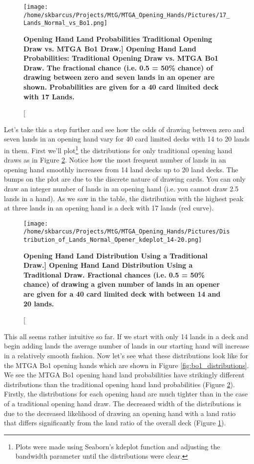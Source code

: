 \documentclass[oneside]{book}   %
\begin{document}
 	\begin{figure}[!ht]
	\centering
	\centerline{\texttt{[image: /home/skbarcus/Projects/MtG/MTGA\_Opening\_Hands/Pictures/17\_Lands\_Normal\_vs\_Bo1.png]}}
	\caption[\bf{Opening Hand Land Probabilities Traditional Opening Draw vs. MTGA Bo1 Draw.}]{
	{\bf{Opening Hand Land Probabilities: Traditional Opening Draw vs. MTGA Bo1 Draw.}} The fractional chance (i.e. 0.5 = 50\% chance) of drawing between zero and seven lands in an opener are shown. Probabilities are given for a 40 card limited deck with 17 Lands.}
	\label{fig:traditional_vs_bo1_17}
	\end{figure}	
	
Let's take this a step further and see how the odds of drawing between zero and seven lands in an opening hand vary for 40 card limited decks with 14 to 20 lands in them. First we'll plot\footnote{Plots were made using Seaborn's kdeplot function and adjusting the bandwidth parameter until the distributions were clear.} the distributions for only traditional opening hand draws as in Figure \ref{fig:traditional_distributions}. Notice how the most frequent number of lands in an opening hand smoothly increases from 14 land decks up to 20 land decks. The bumps on the plot are due to the discrete nature of drawing cards. You can only draw an integer number of lands in an opening hand (i.e. you cannot draw 2.5 lands in a hand). As we saw in the table, the distribution with the highest peak at three lands in an opening hand is a deck with 17 lands (red curve).

 	\begin{figure}[!ht]
	\centering
	\centerline{\texttt{[image: /home/skbarcus/Projects/MtG/MTGA\_Opening\_Hands/Pictures/Distribution\_of\_Lands\_Normal\_Opener\_kdeplot\_14-20.png]}}
	\caption[\bf{Opening Hand Land Distribution Using a Traditional Draw.}]{
	{\bf{Opening Hand Land Distribution Using a Traditional Draw.}} Fractional chances (i.e. 0.5 = 50\% chance) of drawing a given number of lands in an opener are given for a 40 card limited deck with between 14 and 20 lands.}
	\label{fig:traditional_distributions}
	\end{figure}	

This all seems rather intuitive so far. If we start with only 14 lands in a deck and begin adding lands the average number of lands in our starting hand will increase in a relatively smooth fashion. Now let's see what these distributions look like for the MTGA Bo1 opening hands which are shown in Figure \ref{fig:bo1_distributions}. We see the MTGA Bo1 opening hand land probabilities have strikingly different distributions than the traditional opening hand land probabilities (Figure \ref{fig:traditional_distributions}). Firstly, the distributions for each opening hand are much tighter than in the case of a traditional opening hand draw. The decreased width of the distributions is due to the decreased likelihood of drawing an opening hand with a land ratio that differs significantly from the land ratio of the overall deck (Figure \ref{fig:traditional_vs_bo1_17}).
\end{document}
